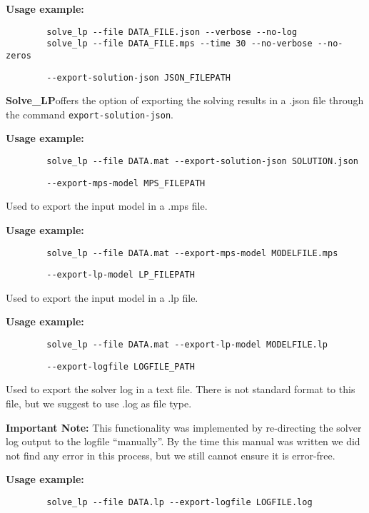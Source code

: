 \documentclass[12pt,hidelinks]{article}
\newcommand{\SolveLP}{\textbf{Solve\_LP}}
\begin{document}
	\textbf{Usage example:} 
	\begin{verbatim}
		solve_lp --file DATA_FILE.json --verbose --no-log
		solve_lp --file DATA_FILE.mps --time 30 --no-verbose --no-zeros
	\end{verbatim}

	{\color{mordantred19}
	\begin{verbatim}
		--export-solution-json JSON_FILEPATH
	\end{verbatim}
	} \SolveLP offers the option of exporting the solving results in a .json file through the command \texttt{export-solution-json}.
	
	\textbf{Usage example:} 
	\begin{verbatim}
		solve_lp --file DATA.mat --export-solution-json SOLUTION.json
	\end{verbatim}

	{\color{mordantred19}
	\begin{verbatim}
		--export-mps-model MPS_FILEPATH
	\end{verbatim}
	} Used to export the input model in a .mps file.
	
	\textbf{Usage example:} 
	\begin{verbatim}
		solve_lp --file DATA.mat --export-mps-model MODELFILE.mps
	\end{verbatim}

	{\color{mordantred19}
	\begin{verbatim}
		--export-lp-model LP_FILEPATH
	\end{verbatim}
	} Used to export the input model in a .lp file.
	
	\textbf{Usage example:} 
	\begin{verbatim}
		solve_lp --file DATA.mat --export-lp-model MODELFILE.lp
	\end{verbatim}

	{\color{mordantred19}
	\begin{verbatim}
		--export-logfile LOGFILE_PATH
	\end{verbatim}
	} Used to export the solver log in a text file. There is not standard format to this file, but we suggest to use .log as file type.

	\textbf{Important Note:} This functionality was implemented by re-directing the solver log output to the logfile ``manually''. By the time this manual was written we did not find any error in this process, but we still cannot ensure it is error-free.
	
	\textbf{Usage example:} 
	\begin{verbatim}
		solve_lp --file DATA.lp --export-logfile LOGFILE.log
	\end{verbatim}
\end{document}
